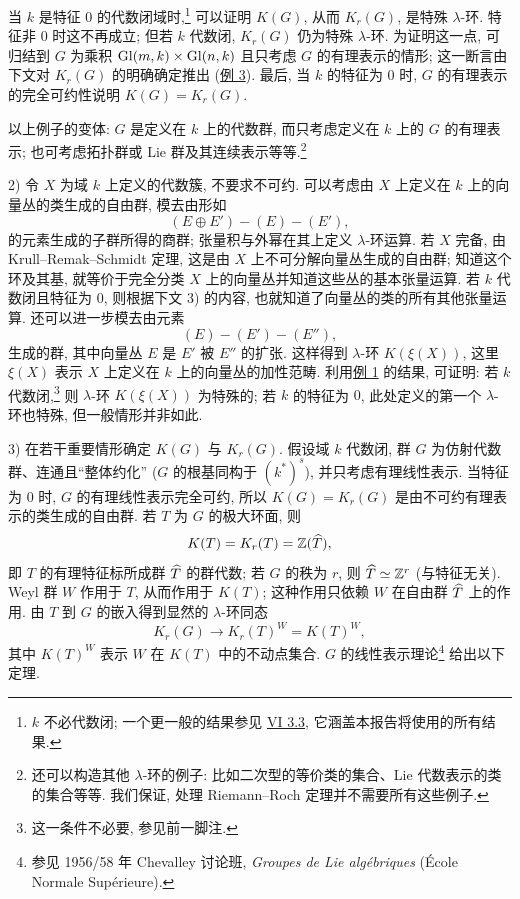 当 $k$ 是特征 $0$ 的代数闭域时,\footnote{$k$ 不必代数闭; 一个更一般的结果参见 \hyperlink{sga6.e06.thm.3-3}{VI 3.3}, 它涵盖本报告将使用的所有结果.} 可以证明 $K(G)$, 从而 $K_r(G)$, 是特殊 $\lambda$-环. 特征非 $0$ 时这不再成立; 但若 $k$ 代数闭, $K_r(G)$ 仍为特殊 $\lambda$-环. 为证明这一点, 可归结到 $G$ 为乘积 $\operatorname{Gl}(m,k)\times\operatorname{Gl}(n,k)$ 且只考虑 $G$ 的有理表示的情形; 这一断言由下文对 $K_r(G)$ 的明确确定推出 (\hyperlink{sga6.e00.ex.2-3}{例 3}). 最后, 当 $k$ 的特征为 $0$ 时, $G$ 的有理表示的完全可约性说明 $K(G)=K_r(G)$.

以上例子的变体: $G$ 是定义在 $k$ 上的代数群, 而只考虑定义在 $k$ 上的 $G$ 的有理表示; 也可考虑拓扑群或 Lie 群及其连续表示等等.\footnote{还可以构造其他 $\lambda$-环的例子: 比如二次型的等价类的集合、Lie 代数表示的类的集合等等. 我们保证, 处理 Riemann--Roch 定理并不需要所有这些例子.}

2) 令 $X$ 为域 $k$ 上定义的代数簇, 不要求不可约. 可以考虑由 $X$ 上定义在 $k$ 上的向量丛的类生成的自由群, 模去由形如
\[
(E\oplus E')-(E)-(E'),
\]
的元素生成的子群所得的商群; 张量积与外幂在其上定义 $\lambda$-环运算. 若 $X$ 完备, 由 Krull--Remak--Schmidt 定理, 这是由 $X$ 上不可分解向量丛生成的自由群; 知道这个环及其基, 就等价于完全分类 $X$ 上的向量丛并知道这些丛的基本张量运算. 若 $k$ 代数闭且特征为 $0$, 则根据下文 3) 的内容, 也就知道了向量丛的类的所有其他张量运算. 还可以进一步模去由元素
\[
(E)-(E')-(E''),
\]
生成的群, 其中向量丛 $E$ 是 $E'$ 被 $E''$ 的扩张. 这样得到 $\lambda$-环 $K(\xi(X))$, 这里 $\xi(X)$ 表示 $X$ 上定义在 $k$ 上的向量丛的加性范畴. 利用\hyperlink{sga6.e00.ex.2-1}{例 1} 的结果, 可证明: 若 $k$ 代数闭,\footnote{这一条件不必要, 参见前一脚注.} 则 $\lambda$-环 $K(\xi(X))$ 为特殊的; 若 $k$ 的特征为 $0$, 此处定义的第一个 $\lambda$-环也特殊, 但一般情形并非如此.

3) 在若干重要情形确定 $K(G)$ 与 $K_r(G)$. 假设域 $k$ 代数闭, 群 $G$ 为仿射代数群、连通且“整体约化” ($G$ 的根基同构于 $(k^*)^s$), 并只考虑有理线性表示. 当特征为 $0$ 时, $G$ 的有理线性表示完全可约, 所以 $K(G)=K_r(G)$ 是由不可约有理表示的类生成的自由群. 若 $T$ 为 $G$ 的极大环面, 则
\[
K(T)=K_r(T)=\mathbb Z(\widehat T),
\]
即 $T$ 的有理特征标所成群 $\widehat T$ 的群代数; 若 $G$ 的秩为 $r$, 则 $\widehat T\simeq\mathbb Z^r$ (与特征无关). Weyl 群 $W$ 作用于 $T$, 从而作用于 $K(T)$; 这种作用只依赖 $W$ 在自由群 $\widehat T$ 上的作用. 由 $T$ 到 $G$ 的嵌入得到显然的 $\lambda$-环同态
\begin{equation}\tag{1.13}
K_r(G)\longrightarrow K_r(T)^W=K(T)^W,
\end{equation}
其中 $K(T)^W$ 表示 $W$ 在 $K(T)$ 中的不动点集合. $G$ 的线性表示理论\footnote{参见 1956/58 年 Chevalley 讨论班, \emph{Groupes de Lie algébriques} (École Normale Supérieure).} 给出以下定理.

